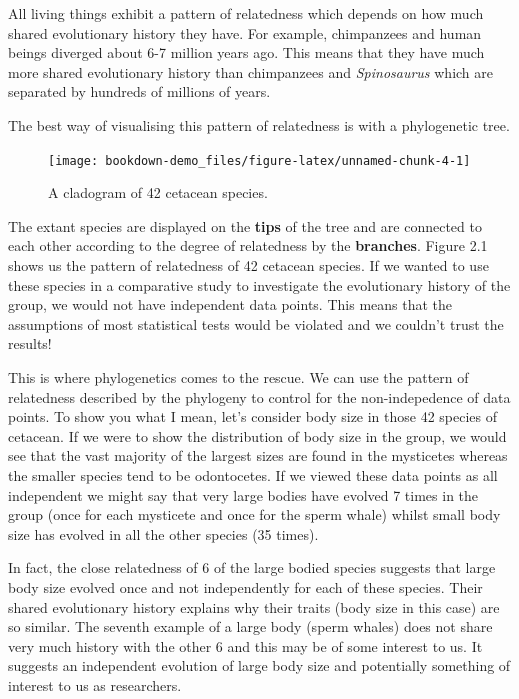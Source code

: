 \documentclass[
]{book}
\begin{document}
All living things exhibit a pattern of relatedness which depends on how much shared evolutionary history they have. For example, chimpanzees and human beings diverged about 6-7 million years ago. This means that they have much more shared evolutionary history than chimpanzees and \emph{Spinosaurus} which are separated by hundreds of millions of years.

The best way of visualising this pattern of relatedness is with a phylogenetic tree.

\begin{figure}[H]

{\centering \texttt{[image: bookdown-demo\_files/figure-latex/unnamed-chunk-4-1]} 

}

\caption{A cladogram of 42 cetacean species.}\label{fig:unnamed-chunk-4}
\end{figure}

The extant species are displayed on the \textbf{tips} of the tree and are connected to each other according to the degree of relatedness by the \textbf{branches}. Figure 2.1 shows us the pattern of relatedness of 42 cetacean species. If we wanted to use these species in a comparative study to investigate the evolutionary history of the group, we would not have independent data points. This means that the assumptions of most statistical tests would be violated and we couldn't trust the results!

This is where phylogenetics comes to the rescue. We can use the pattern of relatedness described by the phylogeny to control for the non-indepedence of data points. To show you what I mean, let's consider body size in those 42 species of cetacean. If we were to show the distribution of body size in the group, we would see that the vast majority of the largest sizes are found in the mysticetes whereas the smaller species tend to be odontocetes. If we viewed these data points as all independent we might say that very large bodies have evolved 7 times in the group (once for each mysticete and once for the sperm whale) whilst small body size has evolved in all the other species (35 times).

In fact, the close relatedness of 6 of the large bodied species suggests that large body size evolved once and not independently for each of these species. Their shared evolutionary history explains why their traits (body size in this case) are so similar. The seventh example of a large body (sperm whales) does not share very much history with the other 6 and this may be of some interest to us. It suggests an independent evolution of large body size and potentially something of interest to us as researchers.
\end{document}
